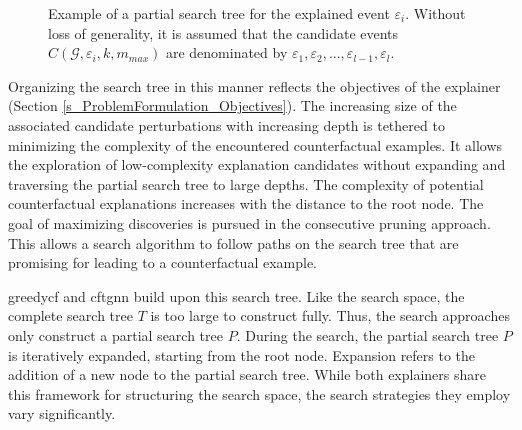 

\begin{figure} [ht]
    \centering
    
    \caption{Example of a partial search tree for the explained event $\varepsilon_i$. Without loss of generality, it is assumed that the candidate events $C(\mathcal{G}, \varepsilon_i, k, m_{max})$ are denominated by $\varepsilon_1, \varepsilon_2, ..., \varepsilon_{l - 1}, \varepsilon_{l}$.}
    \label{f_SearchTree_Example}
\end{figure}

Organizing the search tree in this manner reflects the objectives of the explainer (Section \ref{s_ProblemFormulation_Objectives}). The increasing size of the associated candidate perturbations with increasing depth is tethered to minimizing the complexity of the encountered counterfactual examples. It allows the exploration of low-complexity explanation candidates without expanding and traversing the partial search tree to large depths. The complexity of potential counterfactual explanations increases with the distance to the root node. The goal of maximizing discoveries is pursued in the consecutive pruning approach. This allows a search algorithm to follow paths on the search tree that are promising for leading to a counterfactual example.

\gls{greedycf} and \gls{cftgnn} build upon this search tree. Like the search space, the complete search tree $T$ is too large to construct fully. Thus, the search approaches only construct a partial search tree $P$. During the search, the partial search tree $P$ is iteratively expanded, starting from the root node. Expansion refers to the addition of a new node to the partial search tree. While both explainers share this framework for structuring the search space, the search strategies they employ vary significantly.


